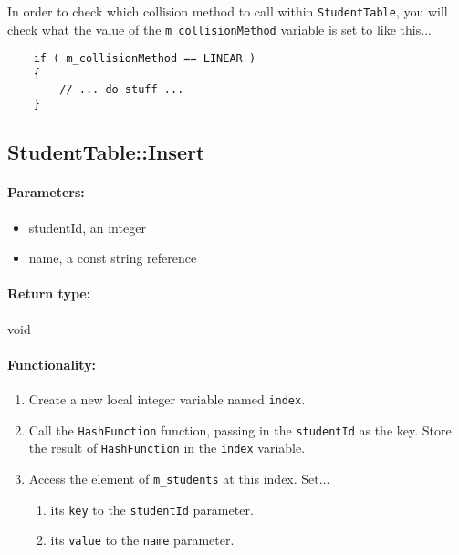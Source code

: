 \documentclass[a4paper,12pt,oneside]{book}
\begin{document}
In order to check which collision method to call within \texttt{StudentTable},
you will check what the value of the \texttt{m\_collisionMethod} variable is
set to like this...

\begin{verbatim}
    if ( m_collisionMethod == LINEAR )
    {
        // ... do stuff ...
    }
\end{verbatim}



\subsection{StudentTable::Insert}

\paragraph{Parameters:}

\begin{itemize}
    \item   studentId, an integer
    \item   name, a const string reference
\end{itemize}

\paragraph{Return type:} void

\paragraph{Functionality:}

\begin{enumerate}
    \item   Create a new local integer variable named \texttt{index}.
    \item   Call the \texttt{HashFunction} function, passing in the
        \texttt{studentId} as the key. Store the result of \texttt{HashFunction}
        in the \texttt{index} variable.
    \item   Access the element of \texttt{m\_students} at this index. Set...
    \begin{enumerate}
        \item   its \texttt{key} to the \texttt{studentId} parameter.
        \item   its \texttt{value} to the \texttt{name} parameter.
    \end{enumerate}
\end{enumerate}
\end{document}
